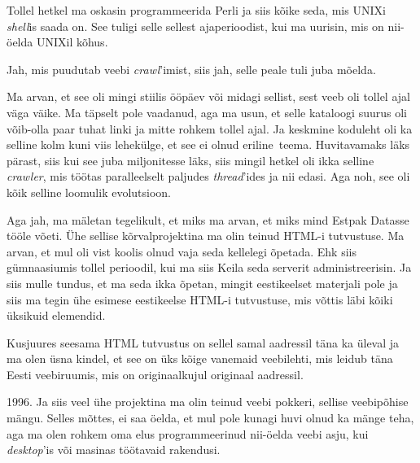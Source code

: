 
Tollel hetkel ma oskasin programmeerida Perli ja siis kõike seda, mis  UNIXi \emph{shell}is saada on. See tuligi selle sellest ajaperioodist, kui ma uurisin, mis on nii-öelda UNIXil  kõhus.


Jah, mis puudutab veebi \emph{crawl}'imist,  siis jah, selle peale tuli juba mõelda.


Ma arvan, et see oli mingi stiilis ööpäev või midagi sellist, sest veeb oli tollel ajal väga väike. Ma täpselt pole vaadanud, aga ma usun, et selle kataloogi suurus oli võib-olla paar tuhat linki ja mitte rohkem tollel ajal. Ja keskmine koduleht oli ka selline kolm kuni viis lehekülge, et see ei  olnud eriline teema. Huvitavamaks läks pärast, siis kui see juba miljonitesse läks, siis mingil hetkel oli ikka selline \emph{crawler}, mis töötas paralleelselt  paljudes \emph{thread}'ides ja nii edasi. Aga noh, see oli kõik selline loomulik evolutsioon. 

Aga jah, ma mäletan tegelikult, et miks ma arvan, et miks mind Estpak Datasse tööle võeti. Ühe sellise kõrvalprojektina ma olin teinud HTML-i tutvustuse. Ma arvan, et mul oli vist koolis olnud vaja seda kellelegi õpetada. Ehk siis gümnaasiumis tollel perioodil, kui ma siis Keila seda serverit administreerisin. Ja siis mulle tundus, et ma seda ikka õpetan, mingit eestikeelset materjali pole ja siis ma tegin ühe esimese  eestikeelse HTML-i tutvustuse, mis võttis läbi kõiki üksikuid elemendid. 


Kusjuures seesama HTML tutvustus on sellel samal aadressil täna ka üleval ja ma olen üsna kindel, et see on üks kõige vanemaid veebilehti, mis leidub täna Eesti veebiruumis, mis on originaalkujul originaal aadressil. 


1996. Ja siis veel ühe projektina ma olin teinud veebi pokkeri, sellise  veebipõhise mängu. Selles mõttes,  ei saa öelda, et  mul pole kunagi huvi olnud ka mänge teha, aga ma olen  rohkem  oma elus programmeerinud nii-öelda veebi asju, kui \emph{desktop}'is või masinas töötavaid rakendusi. 

